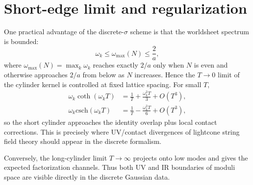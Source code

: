 \documentclass[11pt]{article}
\numberwithin{equation}{section}
\begin{document}
\section{Short-edge limit and regularization}
One practical advantage of the discrete-$\sigma$ scheme is that the worldsheet spectrum is bounded:
\begin{equation}
\label{eq:s18-001}
\omega_k\leq \omega_{\max}(N)\leq \frac{2}{a},
\end{equation}
where $\omega_{\max}(N)=\max_k \omega_k$ reaches exactly $2/a$ only when $N$ is even and otherwise approaches $2/a$ from below as $N$ increases.
Hence the $T\to 0$ limit of the cylinder kernel is controlled at fixed lattice spacing. For small $T$,
\begin{align}
\omega_k\coth(\omega_k T)&=\frac{1}{T}+\frac{\omega_k^2 T}{3}+O(T^3),
\label{eq:s15-smallT-coth}\\
\omega_k\mathrm{csch}(\omega_k T)&=\frac{1}{T}-\frac{\omega_k^2 T}{6}+O(T^3),
\label{eq:s15-smallT-csch}
\end{align}
so the short cylinder approaches the identity overlap plus local contact corrections. This is precisely where UV/contact divergences of lightcone string field theory should appear in the discrete formalism.

Conversely, the long-cylinder limit $T\to\infty$ projects onto low modes and gives the expected factorization channels. Thus both UV and IR boundaries of moduli space are visible directly in the discrete Gaussian data.
\end{document}
